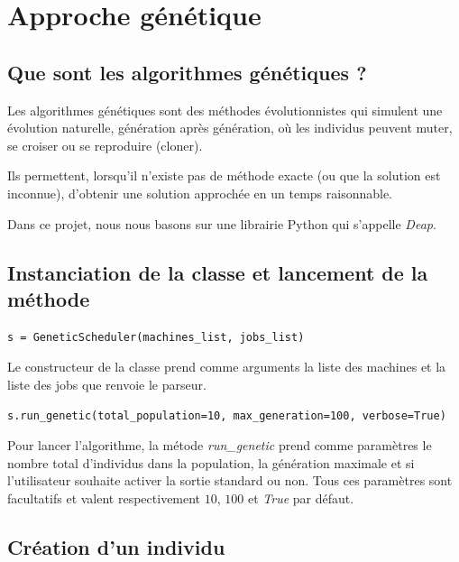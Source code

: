 \section{Approche génétique}

\subsection{Que sont les algorithmes génétiques ?}

Les algorithmes génétiques sont des méthodes évolutionnistes qui simulent une évolution naturelle, génération après génération, où les individus peuvent muter, se croiser ou se reproduire (cloner).

Ils permettent, lorsqu'il n'existe pas de méthode exacte (ou que la solution est inconnue), d'obtenir une solution approchée en un temps raisonnable.

Dans ce projet, nous nous basons sur une librairie Python qui s'appelle \textit{Deap}.

\subsection{Instanciation de la classe et lancement de la méthode}

\begin{lstlisting}
s = GeneticScheduler(machines_list, jobs_list)
\end{lstlisting}

Le constructeur de la classe prend comme arguments la liste des machines et la liste des jobs que renvoie le parseur.

\begin{lstlisting}
s.run_genetic(total_population=10, max_generation=100, verbose=True)
\end{lstlisting}

Pour lancer l'algorithme, la métode \textit{run\_genetic} prend comme paramètres le nombre total d'individus dans la population, la génération maximale et si l'utilisateur souhaite activer la sortie standard ou non. Tous ces paramètres sont facultatifs et valent respectivement $10$, $100$ et \textit{True} par défaut.

\subsection{Création d'un individu}



